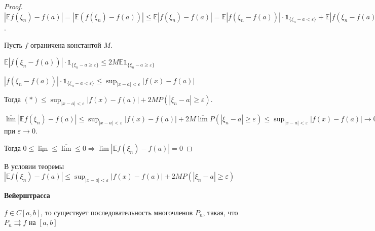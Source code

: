 \begin{proof}
    $|\mathbb{E} f(\xi_n) - f(a)| = |\mathbb{E} (f(\xi_n) - f(a))| \leqslant \mathbb{E} |f(\xi_n) - f(a)| = 
    \mathbb{E} |f(\xi_n - f(a))|\cdot \mathds{1}_{\{ \xi_n - a < \varepsilon \}} + \mathbb{E} |f(\xi_n - f(a))|\cdot \mathds{1}_{\{ \xi_n - a \geqslant \varepsilon \}} = (*)$.

    Пусть $f$ ограничена константой $M$.

    $\mathbb{E} |f(\xi_n - f(a))|\cdot \mathds{1}_{\{ \xi_n - a \geqslant \varepsilon \}} \leqslant 2M \mathbb{E} \mathds{1}_{\{ \xi_n - a \geqslant \varepsilon \}}$

    $|f(\xi_n - f(a))|\cdot \mathds{1}_{\{ \xi_n - a < \varepsilon \}} \leqslant \sup_{|x - a| < \varepsilon}|f(x) - f(a)|$

    Тогда $(*) \leqslant \sup_{|x - a| < \varepsilon} |f(x) - f(a)| + 2M P(|\xi_n - a| \geqslant \varepsilon)$.

    $\overline{\lim} |\mathbb{E} f(\xi_n) - f(a)| \leqslant \sup_{|x - a| < \varepsilon} |f(x) - f(a)| + 2M \overline{\lim} P(|\xi_n - a| \geqslant \varepsilon) \leqslant
    \sup_{|x - a| < \varepsilon} |f(x) - f(a)| \rightarrow 0$ при $\varepsilon \to 0$.

    Тогда $0 \leqslant \underline{\lim} \leqslant \overline{\lim} \leqslant 0 \Rightarrow \lim |\mathbb{E} f(\xi_n) - f(a)| = 0$
\end{proof}

\begin{remark}
    В условии теоремы $|\mathbb{E} f(\xi_n) - f(a)| \leqslant \sup_{|x - a| < \varepsilon} |f(x) - f(a)| + 2M P(|\xi_n - a| \geqslant \varepsilon)$
\end{remark}

\begin{theorem}
    \textbf{Вейерштрасса}

    $f \in C[a, b]$, то существует последовательность многочленов $P_n$, такая, что $P_n \rightrightarrows f$ на $[a, b]$
\end{theorem}

